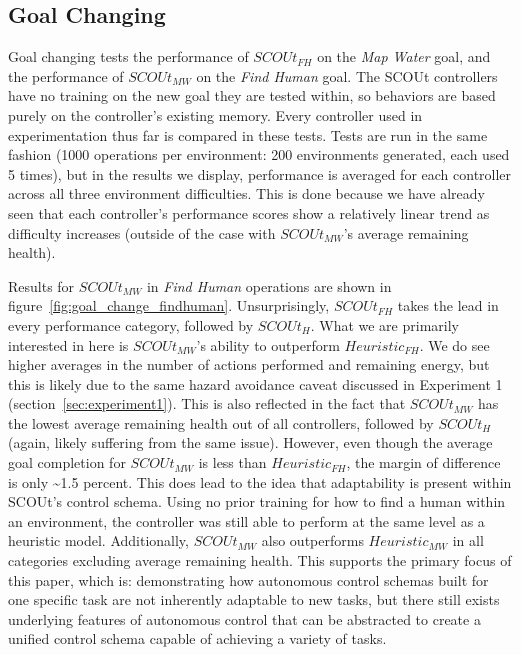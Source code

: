 \subsection{Goal Changing}
Goal changing tests the performance of $SCOUt_{FH}$ on the \textit{Map Water} goal, and the performance of $SCOUt_{MW}$ on the \textit{Find Human} goal.
The SCOUt controllers have no training on the new goal they are tested within, so behaviors are based purely on the controller's existing memory.
Every controller used in experimentation thus far is compared in these tests.
Tests are run in the same fashion (1000 operations per environment: 200 environments generated, each used 5 times), but in the results we display, performance is averaged for each controller across all three environment difficulties.
This is done because we have already seen that each controller's performance scores show a relatively linear trend as difficulty increases (outside of the case with $SCOUt_{MW}$'s average remaining health).

Results for $SCOUt_{MW}$ in \textit{Find Human} operations are shown in figure~\ref{fig:goal_change_findhuman}.
Unsurprisingly, $SCOUt_{FH}$ takes the lead in every performance category, followed by $SCOUt_{H}$.
What we are primarily interested in here is $SCOUt_{MW}$'s ability to outperform $Heuristic_{FH}$.
We do see higher averages in the number of actions performed and remaining energy, but this is likely due to the same hazard avoidance caveat discussed in Experiment 1 (section~\ref{sec:experiment1}).
This is also reflected in the fact that $SCOUt_{MW}$ has the lowest average remaining health out of all controllers, followed by $SCOUt_{H}$ (again, likely suffering from the same issue).
However, even though the average goal completion for $SCOUt_{MW}$ is less than $Heuristic_{FH}$, the margin of difference is only \textasciitilde1.5 percent.
This does lead to the idea that adaptability is present within SCOUt's control schema.
Using no prior training for how to find a human within an environment, the controller was still able to perform at the same level as a heuristic model.
Additionally, $SCOUt_{MW}$ also outperforms $Heuristic_{MW}$ in all categories excluding average remaining health.
This supports the primary focus of this paper, which is: demonstrating how autonomous control schemas built for one specific task are not inherently adaptable to new tasks, but there still exists underlying features of autonomous control that can be abstracted to create a unified control schema capable of achieving a variety of tasks.

